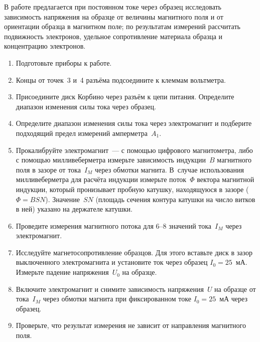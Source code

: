 \begin{lab:task}

В работе предлагается при постоянном токе через образец исследовать зависимость
напряжения на образце от величины магнитного поля и от ориентации образца в
магнитном поле; по результатам измерений рассчитать подвижность электронов,
удельное сопротивление материала образца и концентрацию электронов.

\begin{enumerate}

\item{ Подготовьте приборы к работе.}

\item{ Концы от точек~3 и~4 разъёма подсоедините к клеммам вольтметра.}

\item{ Присоедините диск Корбино через разъём к цепи питания. Определите
диапазон изменения силы тока через образец.}

\item{ Определите диапазон изменения силы тока через электромагнит и подберите
подходящий предел измерений амперметра~$A_1$.}

\item{ Прокалибруйте электромагнит~--- с помощью цифрового магнитометра, либо с
помощью милливеберметра измерьте зависимость индукции~$B$ магнитного поля в
зазоре от тока~$I_M$ через обмотки магнита. В~случае использования
милливеберметра для расчёта индукции измерьте поток~$\Phi$ вектора магнитной
индукции, который пронизывает пробную катушку, находящуюся в зазоре
($\Phi=BSN$). Значение~$SN$ (площадь сечения контура катушки на число витков в
ней) указано на держателе катушки.}

\item{ Проведите измерения магнитного потока для 6--8 значений тока~$I_M$
через электромагнит.}

\item{ Исследуйте магнетосопротивление образцов. Для этого вставьте диск в зазор
выключенного электромагнита и установите ток через образец $I_0=25$~мА. Измерьте
падение напряжения~$U_0$ на образце.}

\item{ Включите электромагнит и снимите зависимость напряжения~$U$ на образце от
тока~$I_M$ через обмотки магнита при фиксированном токе $I_0=25$~мА через
образец.}

\item{ Проверьте, что результат измерения не зависит от направления магнитного
поля.}


\end{enumerate}
\end{lab:task}
